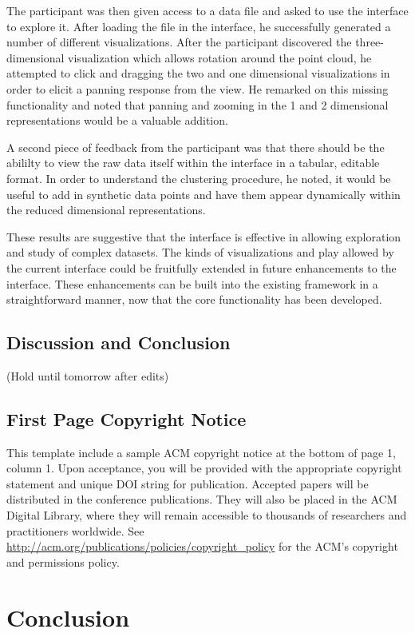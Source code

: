 \documentclass{sigchi}
\begin{document}
The participant was then given access to a data file and asked to use the interface to explore it. After loading the file in the interface, he successfully generated a number of different visualizations. After the participant discovered the three-dimensional visualization which allows rotation around the point cloud, he attempted to click and dragging the two and one dimensional visualizations in order to elicit a panning response from the view. He remarked on this missing functionality and noted that panning and zooming in the 1 and 2 dimensional representations would be a valuable addition.

A second piece of feedback from the participant was that there should be the abililty to view the raw data itself within the interface in a tabular, editable format. In order to understand the clustering procedure, he noted, it would be useful to add in synthetic data points and have them appear dynamically within the reduced dimensional representations.

These results are suggestive that the interface is effective in allowing exploration and study of complex datasets. The kinds of visualizations and play allowed by the current interface could be fruitfully extended in future enhancements to the interface. These enhancements can be built into the existing framework in a straightforward manner, now that the core functionality has been developed.

\subsection{Discussion and Conclusion}
(Hold until tomorrow after edits)


\subsection{First Page Copyright Notice}
This template include a sample ACM copyright notice at the bottom of
page 1, column 1.  Upon acceptance, you will be provided with the
appropriate copyright statement and unique DOI string for publication.
Accepted papers will be distributed in the conference
publications. They will also be placed in the ACM Digital Library,
where they will remain accessible to thousands of researchers and
practitioners worldwide. See
\url{http://acm.org/publications/policies/copyright_policy} for the
ACM's copyright and permissions policy.



\section{Conclusion}
\end{document}
